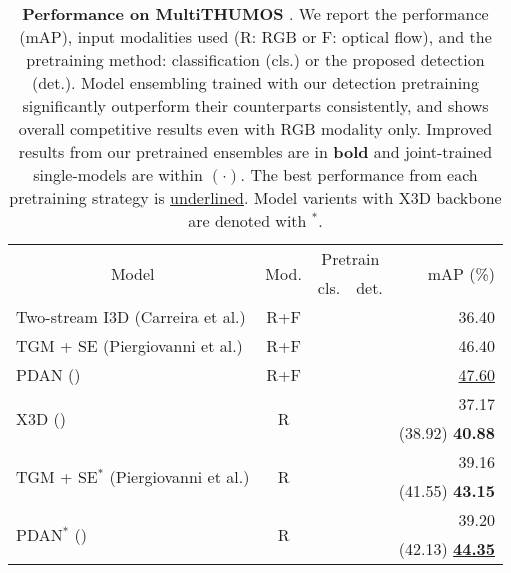 \documentclass[letterpaper]{article} \usepackage{aaai23}  \usepackage{times}  \usepackage{helvet}  \usepackage{courier}  \usepackage[hyphens]{url}  \usepackage{graphicx} \urlstyle{rm} \def\UrlFont{\rm}  \usepackage{natbib}  \usepackage{caption} \frenchspacing  \setlength{\pdfpagewidth}{8.5in}  \setlength{\pdfpageheight}{11in}  \usepackage{algorithm}
\newcommand{\ch}{}
\newcommand{\tablestyle}[2]{\setlength{\tabcolsep}{#1}\renewcommand{\arraystretch}{#2}\centering\footnotesize}
\begin{document}
\begin{table}[t!]
	\centering
	\tablestyle{1.8pt}{1.}
	\fontsize{9}{11}\selectfont
		\begin{tabular}{l|c|c|c|r}
			\multicolumn{1}{c|}{\multirow{2}{*}{Model}}  & \multicolumn{1}{c|}{\multirow{2}{*}{Mod.}} & \multicolumn{2}{c|}{Pretrain}  & \multirow{2}{*}{$\;$mAP (\%)} \\
			{} & {} & cls. & det. & {} \\
			\shline
			{Two-stream I3D (Carreira et al.)} & R+F & \checkmark & {} & 36.40 \\
			{TGM + SE (Piergiovanni et al.)} & R+F & \checkmark & {} & 46.40 \\
			{PDAN (\citeauthor{dai2021pdan})} & R+F & \checkmark & {} & \underline{47.60} \\
			
			\hline
			\multirow{2}{*}{{X3D (\citeauthor{feichtenhofer2020x3d})}} & \multirow{2}{*}{R} & \checkmark & {} &   37.17 \\
			{} & {} & {} & \checkmark & {(38.92) \textbf{40.88}} \\
			\hline
			\multirow{2}{*}{{TGM + SE$^*$ (Piergiovanni et al.)}} & \multirow{2}{*}{R} & \checkmark & {} & {39.16}  \\
			{} & {} & {} & \checkmark & {(41.55) \textbf{43.15}} \\
			\hline
			\multirow{2}{*}{{PDAN$^*$ (\citeauthor{dai2021pdan})}} & \multirow{2}{*}{R} & \checkmark & {} & {39.20}  \\
			{} & {} & {} & \checkmark & {(42.13) \textbf{\underline{44.35}}} \\
			

	\end{tabular}
	\caption{\textbf{Performance on MultiTHUMOS} \cite{yeung2018every}. We report the performance (mAP), input modalities used (R: RGB or F: optical flow), and the pretraining method: classification (cls.) or the proposed detection (det.). Model ensembling trained with our detection pretraining significantly outperform their counterparts consistently, and shows overall competitive results even with RGB modality only. Improved results from our pretrained ensembles are in \textbf{bold} and \ch{joint-trained single-models are within $(\cdot)$.} The best performance from each pretraining strategy is \underline{underlined}. Model varients with X3D backbone are denoted with $^*$.}
	\label{tab:thumos}
\end{table}
\end{document}
